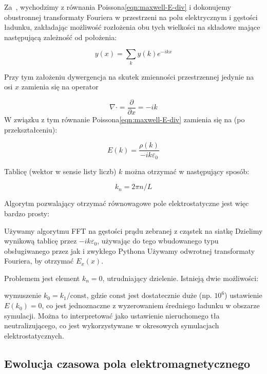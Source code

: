 Za~\cite{birdsall}, wychodzimy z równania Poissona\ref{eqn:maxwell-E-div} i dokonujemy
obustronnej transformaty Fouriera w przestrzeni na polu elektrycznym i gęstości ładunku,
zakładając możliwość rozłożenia obu tych wielkości na składowe mające następującą zależność
od położenia:

\begin{equation}
y(x) = \sum_k y(k) e^{-i k x}
\label{eqn:fourier-decomposition}
\end{equation}

Przy tym założeniu dywergencja na skutek zmienności przestrzennej jedynie na osi $x$
zamienia się na operator

\begin{equation}
\nabla \cdot = \frac{\partial}{\partial x} = -ik
\end{equation}
W związku z tym równanie Poissona\ref{eqn:maxwell-E-div} zamienia się na (po przekształceniu):

\begin{equation}
    E(k) = \frac{\rho(k)}{-ik \varepsilon_0}
\end{equation}

Tablicę (wektor w sensie listy liczb) $k$ można otrzymać w następujący sposób:

\begin{equation}
    k_n = 2 \pi n / L
\end{equation}


Algorytm pozwalający otrzymać równowagowe pole elektrostatyczne jest więc bardzo prosty:
\begin{enumerate}
\itemi{} Używamy algorytmu FFT na gęstości prądu zebranej z cząstek na siatkę
\itemi{} Dzielimy wynikową tablicę przez $-ik \varepsilon_0$, używając do tego wbudowanego typu  obsługiwanego przez  jak i zwykłego Pythona
\itemi{} Używamy odwrotnej transformaty Fouriera, by otrzymać $E_x(x)$.
\end{enumerate}

Problemem jest element $k_n = 0$, utrudniający dzielenie. Istnieją dwie możliwości:
\begin{itemize}
\itemi{} wymuszenie $k_0 = k_1 / \text{const}$, gdzie $\text{const}$ jest dostatecznie duże (np. $10^6$)
\itemi{} ustawienie $E(k_0) = 0$, co jest jednoznaczne z wyzerowaniem średniego ładunku w
obszarze symulacji. Można to interpretować jako ustawienie nieruchomego tła neutralizującego,
co jest wykorzystywane w okresowych symulacjach elektrostatycznych.
\end{itemize}
\subsection{Ewolucja czasowa pola elektromagnetycznego}

